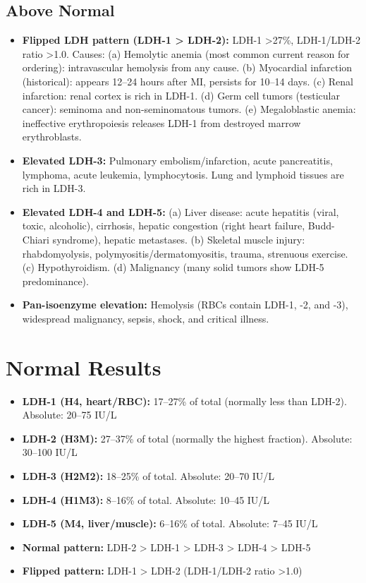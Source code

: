 \subsection*{Above Normal}
\begin{itemize}
  \item \textbf{Flipped LDH pattern (LDH-1 > LDH-2):} LDH-1 >27\%, LDH-1/LDH-2 ratio >1.0. Causes: (a) Hemolytic anemia (most common current reason for ordering): intravascular hemolysis from any cause. (b) Myocardial infarction (historical): appears 12--24 hours after MI, persists for 10--14 days. (c) Renal infarction: renal cortex is rich in LDH-1. (d) Germ cell tumors (testicular cancer): seminoma and non-seminomatous tumors. (e) Megaloblastic anemia: ineffective erythropoiesis releases LDH-1 from destroyed marrow erythroblasts.
  \item \textbf{Elevated LDH-3:} Pulmonary embolism/infarction, acute pancreatitis, lymphoma, acute leukemia, lymphocytosis. Lung and lymphoid tissues are rich in LDH-3.
  \item \textbf{Elevated LDH-4 and LDH-5:} (a) Liver disease: acute hepatitis (viral, toxic, alcoholic), cirrhosis, hepatic congestion (right heart failure, Budd-Chiari syndrome), hepatic metastases. (b) Skeletal muscle injury: rhabdomyolysis, polymyositis/dermatomyositis, trauma, strenuous exercise. (c) Hypothyroidism. (d) Malignancy (many solid tumors show LDH-5 predominance).
  \item \textbf{Pan-isoenzyme elevation:} Hemolysis (RBCs contain LDH-1, -2, and -3), widespread malignancy, sepsis, shock, and critical illness.
\end{itemize}

\section*{Normal Results}
\begin{itemize}
  \item \textbf{LDH-1 (H4, heart/RBC):} 17--27\% of total (normally less than LDH-2). Absolute: 20--75 IU/L
  \item \textbf{LDH-2 (H3M):} 27--37\% of total (normally the highest fraction). Absolute: 30--100 IU/L
  \item \textbf{LDH-3 (H2M2):} 18--25\% of total. Absolute: 20--70 IU/L
  \item \textbf{LDH-4 (H1M3):} 8--16\% of total. Absolute: 10--45 IU/L
  \item \textbf{LDH-5 (M4, liver/muscle):} 6--16\% of total. Absolute: 7--45 IU/L
  \item \textbf{Normal pattern:} LDH-2 > LDH-1 > LDH-3 > LDH-4 > LDH-5
  \item \textbf{Flipped pattern:} LDH-1 > LDH-2 (LDH-1/LDH-2 ratio >1.0)
\end{itemize}

